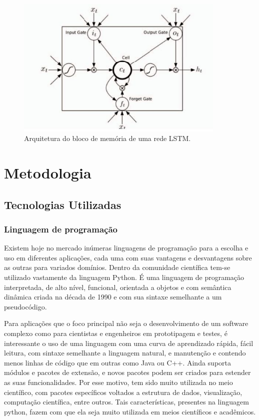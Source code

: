 \documentclass[
	12pt,				%
	oneside,			%
	a4paper,			%
	english,			%
	brazil				%
	]{abntex2}
\begin{document}
	\begin{figure}[h]
\centering 
\includegraphics[width=10cm]{pictures/lstm.JPG} %
\caption{Arquitetura do bloco de memória de uma rede LSTM.}
\label{figura:lstmCell}
\end{figure}





	
\chapter{Metodologia}

\section{Tecnologias Utilizadas}

\subsection{Linguagem de programação}

	Existem hoje no mercado inúmeras linguagens de programação para a escolha e uso em diferentes aplicações, cada uma com suas vantagens e desvantagens sobre as outras para variados domínios. Dentro da comunidade científica tem-se utilizado vastamente da linguagem Python. É uma linguagem de programação interpretada, de alto nível, funcional, orientada a objetos e com semântica dinâmica criada na década de 1990 e com sua sintaxe semelhante a um pseudocódigo. 
	
	
	Para aplicações que o foco principal não seja o desenvolvimento de um software complexo como para cientistas e engenheiros em prototipagem e testes, é interessante o uso de uma linguagem com uma curva de aprendizado rápida, fácil leitura, com sintaxe semelhante a linguagem natural, e manutenção e contendo menos linhas de código que em outras como Java ou C++. Ainda suporta módulos e pacotes de extensão, e novos pacotes podem ser criados para estender as suas funcionalidades. Por esse motivo, tem sido muito utilizada no meio científico, com pacotes específicos voltados a estrutura de dados, visualização, computação científica, entre outros. Tais características, presentes na linguagem python, fazem com que ela seja muito utilizada em meios científicos e acadêmicos. 
		
\end{document}
